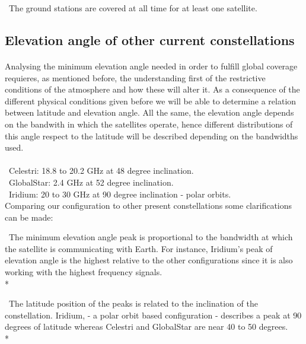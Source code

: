 \textendash\ The ground stations are covered at all time for at least one satellite.\\

\subsection{Elevation angle of other current constellations}

\paragraph{}

Analysing the minimum elevation angle needed in order to fulfill global coverage requieres, as mentioned before, the understanding first of the restrictive conditions of the atmosphere and how these will alter it. As a consequence of the different physical conditions given before we will be able to determine a relation between latitude and elevation angle. All the same, the elevation angle depends on the bandwith in which the satellites operate, hence different distributions of this angle respect to the latitude will be described depending on the bandwidths used. 


\paragraph{}

\textendash\ Celestri: 18.8 to 20.2 GHz at 48 degree inclination.\\
\textendash\ GlobalStar: 2.4 GHz at 52 degree inclination.\\
\textendash\ Iridium: 20 to 30 GHz at 90 degree inclination - polar orbits.\\

Comparing our configuration to other present constellations some clarifications can be made: 

\textendash\ The minimum elevation angle peak is proportional to the bandwidth at which the satellite is communicating with Earth. For instance, Iridium's peak of elevation angle is the highest relative to the other configurations since it is also working with the highest frequency signals. \\*

\textendash\ The latitude position of the peaks is related to the inclination of the constellation. Iridium, - a polar orbit based configuration - describes a peak at 90 degrees of latitude whereas Celestri and GlobalStar are near 40 to 50 degrees. \\*

